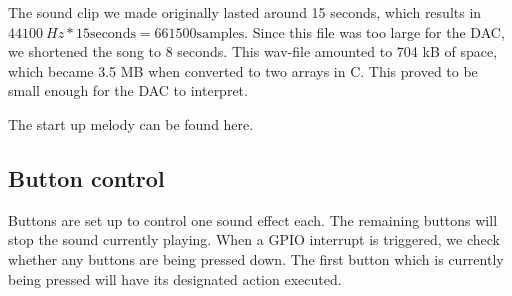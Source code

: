 The sound clip we made originally lasted around 15 seconds, which results in $\SI{44100}{Hz} * 15 \text{seconds} = 661500 \text{samples}$.
Since this file was too large for the DAC, we shortened the song to 8 seconds.
This wav-file amounted to 704 kB of space, which became 3.5 MB when converted to two arrays in C. This proved to be small enough for the DAC to interpret.

The start up melody can be found here. \cite{song}

\subsection{Button control}

Buttons are set up to control one sound effect each. The remaining buttons will stop the sound currently playing.
When a GPIO interrupt is triggered, we check whether any buttons are being pressed down.
The first button which is currently being pressed will have its designated action executed.
